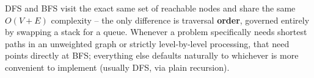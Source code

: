 \begin{takeawaybox}
DFS and BFS visit the exact same set of reachable nodes and share the
same $O(V+E)$ complexity -- the only difference is traversal
\textbf{order}, governed entirely by swapping a stack for a queue.
Whenever a problem specifically needs shortest paths in an unweighted
graph or strictly level-by-level processing, that need points directly
at BFS; everything else defaults naturally to whichever is more
convenient to implement (usually DFS, via plain recursion).
\end{takeawaybox}
